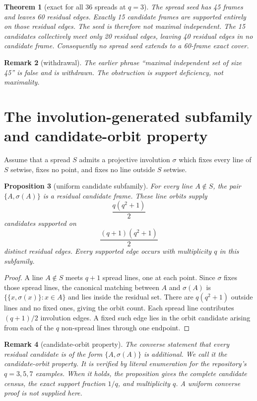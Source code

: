 \documentclass[11pt]{article}
\newtheorem{theorem}{Theorem}
\newtheorem{proposition}[theorem]{Proposition}
\newtheorem{remark}[theorem]{Remark}
\begin{document}
\begin{theorem}[exact for all 36 spreads at \(q=3\)]
The spread seed has 45 frames and leaves 60 residual edges. Exactly 15 candidate
frames are supported entirely on those residual edges. The seed is therefore
not maximal independent. The 15 candidates collectively meet only 20 residual
edges, leaving 40 residual edges in no candidate frame. Consequently no spread
seed extends to a 60-frame exact cover.
\end{theorem}

\begin{remark}[withdrawal]
The earlier phrase ``maximal independent set of size 45'' is false and is
withdrawn. The obstruction is support deficiency, not maximality.
\end{remark}

\section{The involution-generated subfamily and candidate-orbit property}
Assume that a spread \(S\) admits a projective involution \(\sigma\) which fixes
every line of \(S\) setwise, fixes no point, and fixes no line outside \(S\)
setwise.

\begin{proposition}[uniform candidate subfamily]
For every line \(A\notin S\), the pair \(\{A,\sigma(A)\}\) is a residual
candidate frame. These line orbits supply
\[
 \frac{q(q^2+1)}2
\]
candidates supported on
\[
 \frac{(q+1)(q^2+1)}2
\]
distinct residual edges. Every supported edge occurs with multiplicity \(q\)
in this subfamily.
\end{proposition}

\begin{proof}
A line \(A\notin S\) meets \(q+1\) spread lines, one at each point. Since
\(\sigma\) fixes those spread lines, the canonical matching between \(A\) and
\(\sigma(A)\) is \(\{\{x,\sigma(x)\}:x\in A\}\) and lies inside the residual
set. There are \(q(q^2+1)\) outside lines and no fixed ones, giving the orbit
count. Each spread line contributes \((q+1)/2\) involution edges. A fixed such
edge lies in the orbit candidate arising from each of the \(q\) non-spread lines
through one endpoint.
\end{proof}

\begin{remark}[candidate-orbit property]
The converse statement that every residual candidate is of the form
\(\{A,\sigma(A)\}\) is additional. We call it the candidate-orbit property.
It is verified by literal enumeration for the repository's \(q=3,5,7\) examples.
When it holds, the proposition gives the complete candidate census, the exact
support fraction \(1/q\), and multiplicity \(q\). A uniform converse proof is
not supplied here.
\end{remark}
\end{document}
